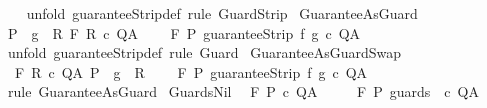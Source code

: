 \begin{isabellebody}
%
\isadelimproof
\ \ %
\endisadelimproof
%
\isatagproof
{}\isamarkupfalse%
\ {\isacharparenleft}unfold\ guaranteeStrip{\isacharunderscore}def{\isacharparenright}\ {\isacharparenleft}rule\ GuardStrip{\isacharparenright}%
\endisatagproof
{\isafoldproof}%
%
\isadelimproof
\isanewline
%
\endisadelimproof
\isanewline
{}\isamarkupfalse%
\ GuaranteeAsGuard{\isacharcolon}\isanewline
\ {\isachardoublequoteopen}{\isasymlbrakk}P\ {\isasymsubseteq}\ g\ {\isasyminter}\ R{\isacharsemicolon}\ {\isasymGamma}{\isacharcomma}{\isasymTheta}{\isasymturnstile}\isactrlbsub {\isacharslash}F\isactrlesub \ R\ c\ Q{\isacharcomma}A{\isasymrbrakk}\ \isanewline
\ \ {\isasymLongrightarrow}\ {\isasymGamma}{\isacharcomma}{\isasymTheta}{\isasymturnstile}\isactrlbsub {\isacharslash}F\isactrlesub \ P\ {\isacharparenleft}guaranteeStrip\ f\ g\ c{\isacharparenright}\ Q{\isacharcomma}A{\isachardoublequoteclose}\isanewline
%
\isadelimproof
\ \ %
\endisadelimproof
%
\isatagproof
{}\isamarkupfalse%
\ {\isacharparenleft}unfold\ guaranteeStrip{\isacharunderscore}def{\isacharparenright}\ {\isacharparenleft}rule\ Guard{\isacharparenright}%
\endisatagproof
{\isafoldproof}%
%
\isadelimproof
\isanewline
%
\endisadelimproof
\isanewline
\isanewline
{}\isamarkupfalse%
\ GuaranteeAsGuardSwap{\isacharcolon}\isanewline
\ {\isachardoublequoteopen}{\isasymlbrakk}\ {\isasymGamma}{\isacharcomma}{\isasymTheta}{\isasymturnstile}\isactrlbsub {\isacharslash}F\isactrlesub \ R\ c\ Q{\isacharcomma}A{\isacharsemicolon}\ P\ {\isasymsubseteq}\ g\ {\isasyminter}\ R{\isasymrbrakk}\ \isanewline
\ \ {\isasymLongrightarrow}\ {\isasymGamma}{\isacharcomma}{\isasymTheta}{\isasymturnstile}\isactrlbsub {\isacharslash}F\isactrlesub \ P\ {\isacharparenleft}guaranteeStrip\ f\ g\ c{\isacharparenright}\ Q{\isacharcomma}A{\isachardoublequoteclose}\isanewline
%
\isadelimproof
\ \ %
\endisadelimproof
%
\isatagproof
{}\isamarkupfalse%
\ {\isacharparenleft}rule\ GuaranteeAsGuard{\isacharparenright}%
\endisatagproof
{\isafoldproof}%
%
\isadelimproof
\isanewline
%
\endisadelimproof
\isanewline
{}\isamarkupfalse%
\ GuardsNil{\isacharcolon}\isanewline
\ \ {\isachardoublequoteopen}{\isasymGamma}{\isacharcomma}{\isasymTheta}{\isasymturnstile}\isactrlbsub {\isacharslash}F\isactrlesub \ P\ c\ Q{\isacharcomma}A\ {\isasymLongrightarrow}\ \isanewline
\ \ \ {\isasymGamma}{\isacharcomma}{\isasymTheta}{\isasymturnstile}\isactrlbsub {\isacharslash}F\isactrlesub \ P\ {\isacharparenleft}guards\ {\isacharbrackleft}{\isacharbrackright}\ c{\isacharparenright}\ Q{\isacharcomma}A{\isachardoublequoteclose}\isanewline

\end{isabellebody}
